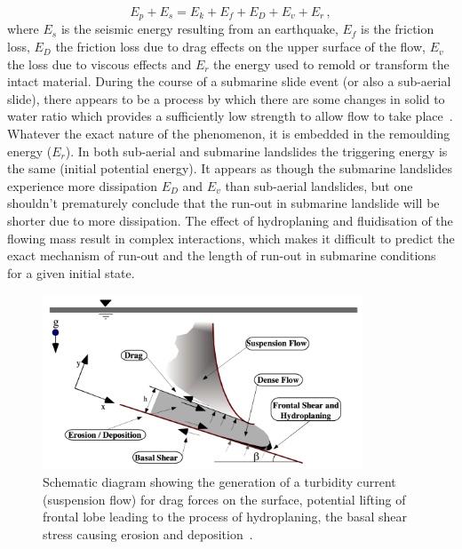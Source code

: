 \begin{equation}
E_p + E_s = E_k + E_f + E_D + E_v + E_r\,,
\end{equation}
where $E_s$ is the seismic energy resulting from an earthquake, $E_f$ is the 
friction loss, $E_D$ the friction loss due to drag effects on the upper surface 
of the flow, $E_v$ the loss due to viscous effects and $E_r$ the energy used to 
remold or transform the intact material. During the course of a submarine slide 
event (or also a sub-aerial slide), there appears to be a process by which 
there are some changes in solid to water ratio which provides a sufficiently 
low strength to allow flow to take place~\citep{Locat2002}. Whatever the exact 
nature of the phenomenon, it is embedded in the remoulding energy ($E_r$). In 
both sub-aerial and submarine landslides the triggering energy is the same 
(initial potential energy). It appears as though the submarine landslides 
experience more dissipation $E_D$ and $E_v$ than sub-aerial landslides, but one 
shouldn't prematurely conclude that the run-out in submarine landslide will be 
shorter due to more dissipation. The effect of hydroplaning and fluidisation of 
the flowing mass result in complex interactions, which makes it difficult to 
predict the exact mechanism of run-out and the length of run-out in 
submarine conditions for a given initial state. 

\begin{figure}[tbhp]
\centering
\includegraphics[width=0.85\textwidth]{Submarine_landslide}
\caption[Complex interactions in a submarine landslide]{Schematic diagram 
showing the generation of a turbidity current (suspension flow) for drag forces 
on the surface, potential lifting of frontal lobe leading to the process of 
hydroplaning, the basal shear stress causing erosion and 
deposition~\citep{Locat2002}.}
\label{fig:Submarine_landslide}
\end{figure}

